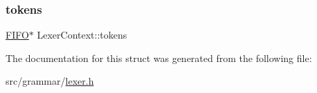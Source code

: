 \hypertarget{structLexerContext_ad11164365dd9f5e321acc076b6445f0f}{}\label{structLexerContext_ad11164365dd9f5e321acc076b6445f0f} 
\subsubsection{\texorpdfstring{tokens}{tokens}}
{\footnotesize\ttfamily \hyperlink{structFIFO}{F\+I\+FO}$\ast$ Lexer\+Context\+::tokens}



The documentation for this struct was generated from the following file\+:\begin{DoxyCompactItemize}
\item 
src/grammar/\hyperlink{lexer_8h}{lexer.\+h}\end{DoxyCompactItemize}
